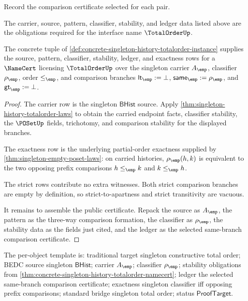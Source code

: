 \begin{definition}
\label{def:totalorder-ledger-policy}
Record the comparison certificate selected for each pair.
\end{definition}

\begin{definition}
\label{def:totalorder-certificate-obligations}
The carrier, source, pattern, classifier, stability, and ledger data listed above are the obligations required for the interface name \(\TotalOrderUp\).
\end{definition}

\begin{theorem}
\label{thm:concrete-singleton-history-totalorder-namecert}
The concrete tuple of
\autoref{def:concrete-singleton-history-totalorder-instance} supplies the
source, pattern, classifier, stability, ledger, and exactness rows for a
$\NameCert$ licensing $\TotalOrderUp$ over the singleton carrier $A_{\emp}$,
classifier $\rho_{\emp}$, order $\le_{\emp}$, and comparison branches
$\mathsf{lt}_{\emp}:=\bot$, $\mathsf{same}_{\emp}:=\rho_{\emp}$, and
$\mathsf{gt}_{\emp}:=\bot$.
\end{theorem}
\begin{proof}
The carrier row is the singleton $\mathsf{BHist}$ source. Apply
\autoref{thm:singleton-history-totalorder-laws} to obtain the carried endpoint
facts, classifier stability, the $\POSetUp$ fields, trichotomy, and comparison
stability for the displayed branches.

The exactness row is the underlying partial-order exactness supplied by
\autoref{thm:singleton-empty-poset-laws}: on carried histories,
$\rho_{\emp}(h,k)$ is equivalent to the two opposing prefix comparisons
$h\le_{\emp}k$ and $k\le_{\emp}h$.

The strict rows contribute no extra witnesses. Both strict comparison branches
are empty by definition, so strict-to-apartness and strict transitivity are
vacuous.

It remains to assemble the public certificate. Repack the source as
$A_{\emp}$, the pattern as the three-way comparison formation, the classifier
as $\rho_{\emp}$, the stability data as the fields just cited, and the ledger
as the selected same-branch comparison certificate.
\end{proof}

The per-object template is: traditional target singleton constructive total
order; BEDC source singleton $\mathsf{BHist}$; carrier $A_{\emp}$; classifier
$\rho_{\emp}$; stability obligations from
\autoref{thm:concrete-singleton-history-totalorder-namecert}; ledger the
selected same-branch comparison certificate; exactness singleton classifier
iff opposing prefix comparisons; standard bridge singleton total order; status
$\mathsf{ProofTarget}$.

